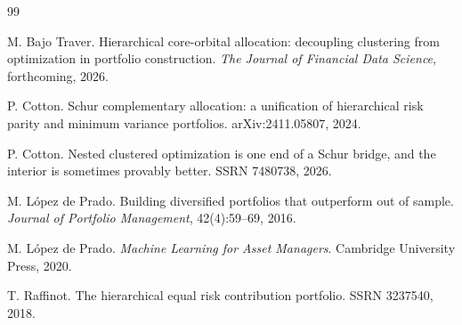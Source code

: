 \documentclass[11pt]{article}
\begin{document}
\begin{thebibliography}{99}

M. Bajo Traver.
Hierarchical core-orbital allocation: decoupling clustering from optimization in
portfolio construction.
\emph{The Journal of Financial Data Science}, forthcoming, 2026.

P. Cotton.
Schur complementary allocation: a unification of hierarchical risk parity and
minimum variance portfolios.
arXiv:2411.05807, 2024.

P. Cotton.
Nested clustered optimization is one end of a Schur bridge, and the interior is
sometimes provably better.
SSRN 7480738, 2026.

M. L\'opez de Prado.
Building diversified portfolios that outperform out of sample.
\emph{Journal of Portfolio Management}, 42(4):59--69, 2016.

M. L\'opez de Prado.
\emph{Machine Learning for Asset Managers}.
Cambridge University Press, 2020.

T. Raffinot.
The hierarchical equal risk contribution portfolio.
SSRN 3237540, 2018.

\end{thebibliography}
\end{document}
